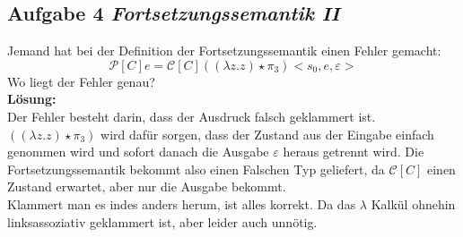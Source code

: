 \documentclass[11pt,a4paper,ngerman]{article}
\begin{document}
\subsection*{Aufgabe 4 \mdseries\itshape Fortsetzungssemantik II}
   Jemand hat bei der Definition der Fortsetzungssemantik einen Fehler gemacht:
   $$
      \mathcal{P}[C] e = \mathcal{C}[C]((\lambda z.z) \star \pi_3) <s_0, e , \varepsilon >
   $$
   Wo liegt der Fehler genau?\\

\textbf{Lösung:}\\
   Der Fehler besteht darin, dass der Ausdruck falsch geklammert ist.\\
   $((\lambda z.z) \star \pi_3)$ wird dafür sorgen, dass der Zustand aus der
   Eingabe einfach genommen wird und sofort danach die Ausgabe $\varepsilon$
   heraus getrennt wird. Die Fortsetzungssemantik bekommt also einen Falschen Typ
   geliefert, da $\mathcal{C}[C]$ einen Zustand erwartet, aber nur die Ausgabe bekommt.\\

   Klammert man es indes anders herum, ist alles korrekt. Da das $\lambda$ Kalkül
   ohnehin linksassoziativ geklammert ist, aber leider auch unnötig.

\label{LastPage}
\end{document}

